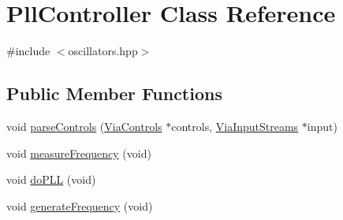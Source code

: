 \hypertarget{class_pll_controller}{}\section{Pll\+Controller Class Reference}
\label{class_pll_controller}


{\ttfamily \#include $<$oscillators.\+hpp$>$}

\subsection*{Public Member Functions}
\begin{DoxyCompactItemize}
\item 
void \mbox{\hyperlink{class_pll_controller_aeb69c603315dde2b197be7fb68752536}{parse\+Controls}} (\mbox{\hyperlink{class_via_controls}{Via\+Controls}} $\ast$controls, \mbox{\hyperlink{class_via_input_streams}{Via\+Input\+Streams}} $\ast$input)
\item 
void \mbox{\hyperlink{class_pll_controller_a3837757a2e97e0bd256d7ff346e1c624}{measure\+Frequency}} (void)
\item 
void \mbox{\hyperlink{class_pll_controller_adb2ddd1018a400f09933b8349abbffc8}{do\+P\+LL}} (void)
\item 
void \mbox{\hyperlink{class_pll_controller_aad1cfc35168ae3067abc452ab47d5806}{generate\+Frequency}} (void)
\end{DoxyCompactItemize}
